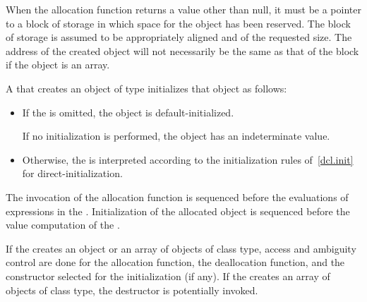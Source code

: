 \pnum
\begin{note}
When the allocation function returns a value other than null, it must be
a pointer to a block of storage in which space for the object has been
reserved. The block of storage is assumed to be appropriately aligned
and of the requested size. The address of the created object will not
necessarily be the same as that of the block if the object is an array.
\end{note}

\pnum
{}%
%
%
%
A  that creates an object of type 
initializes that object as follows:

\begin{itemize}
\item If the  is omitted, the object is
default-initialized.
\begin{note}
If no initialization
is performed, the object has an indeterminate value.
\end{note}

\item Otherwise, the  is interpreted according to
the initialization rules of~\ref{dcl.init} for direct-initialization.
\end{itemize}

\pnum
{}%
%
The invocation of the allocation function is sequenced before
the evaluations of expressions in the . Initialization of
the allocated object is sequenced before the
%
value computation of the
.

\pnum
If the  creates an object or an array of
objects of class type, access and ambiguity control are done for the
allocation function, the deallocation function, and
the constructor selected for the initialization (if any).
If the 
creates an array of objects of class type, the destructor is potentially
invoked.

